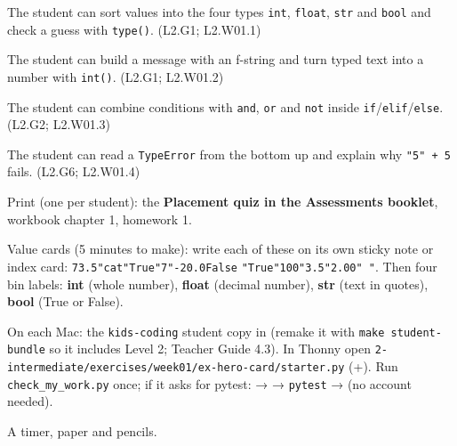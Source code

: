 
\begin{objectives}
  \item The student can sort values into the four types \texttt{int}, \texttt{float}, \texttt{str} and \texttt{bool} and check a guess with \texttt{type()}. (L2.G1; L2.W01.1)
  \item The student can build a message with an f-string and turn typed text into a number with \texttt{int()}. (L2.G1; L2.W01.2)
  \item The student can combine conditions with \texttt{and}, \texttt{or} and \texttt{not} inside \texttt{if}/\texttt{elif}/\texttt{else}. (L2.G2; L2.W01.3)
  \item The student can read a \texttt{TypeError} from the bottom up and explain why \texttt{"5" + 5} fails. (L2.G6; L2.W01.4)
\end{objectives}

\begin{materials}
  \item Print (one per student): the \textbf{Placement quiz in the Assessments booklet}, workbook chapter 1, homework 1.
  \item Value cards (5 minutes to make): write each of these on its own sticky note or index card:
        \texttt{7}\quad \texttt{3.5}\quad \texttt{"cat"}\quad \texttt{True}\quad \texttt{"7"}\quad \texttt{-2}\quad \texttt{0.0}\quad \texttt{False}\quad
        \texttt{"True"}\quad \texttt{100}\quad \texttt{"3.5"}\quad \texttt{2.0}\quad \texttt{0}\quad \texttt{" "}.
        Then four bin labels: \textbf{int} (whole number), \textbf{float} (decimal number), \textbf{str} (text in quotes), \textbf{bool} (True or False).
  \item On each Mac: the \texttt{kids-coding} student copy in  (remake it with \texttt{make student-bundle} so it includes Level 2; Teacher Guide 4.3). In Thonny open
        \texttt{2-intermediate/exercises/week01/ex-hero-card/starter.py} (+). Run \texttt{check\_my\_work.py} once; if it asks
        for pytest:  →  → \texttt{pytest} →  (no account needed).
  \item A timer, paper and pencils.
\end{materials}


